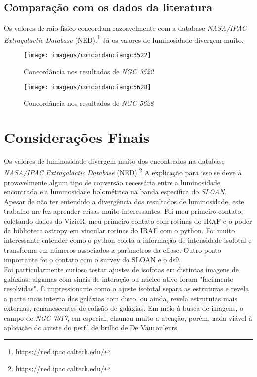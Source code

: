 \documentclass[a4paper, 11pt, fleqn, leqno]{article}
\begin{document}
\subsection{Comparação com os dados da literatura}

\noindent Os valores de raio físico concordam razoavelmente com a database \textit{NASA/IPAC Extragalactic Database} (NED).\footnote{\url{https://ned.ipac.caltech.edu/}} Já os valores de luminosidade divergem muito.\\

\begin{figure}[H]
	\centering
	\texttt{[image: imagens/concordanciangc3522]}
	\caption{Concordância nos resultados de \textit{NGC 3522}}
\end{figure}

\begin{figure}[H]
	\centering
	\texttt{[image: imagens/concordanciangc5628]}
	\caption{Concordância nos resultados de \textit{NGC 5628}}
\end{figure}

\section{Considerações Finais}

\noindent Os valores de luminosidade divergem muito dos encontrados na database \textit{NASA/IPAC Extragalactic Database} (NED).\footnote{\url{https://ned.ipac.caltech.edu/}} A explicação para isso se deve à provavelmente algum tipo de conversão necessária entre a luminosidade encontrada e a luminosidade bolométrica na banda específica do \textit{SLOAN}. \\

\noindent Apesar de não ter entendido a divergência dos resultados de luminosidade, este trabalho me fez aprender coisas muito interessantes: Foi meu primeiro contato, coletando dados do VizieR, meu primeiro contato com rotinas do IRAF e o poder da biblioteca astropy em vincular rotinas do IRAF com o python. Foi muito interessante entender como o python coleta a informação de intensidade isofotal e transforma em números associados a parâmetros da elipse. Outro ponto importante foi o contato com o survey do SLOAN e o ds9.\\

\noindent Foi particularmente curioso testar ajustes de isofotas em distintas imagens de galáxias: algumas com sinais de interação ou núcleo ativo foram "facilmente resolvidas". É impressionante como o ajuste isofotal separa as estruturas e revela a parte mais interna das galáxias com disco, ou ainda, revela estrututas mais externas, remanescentes de colisão de galáxias. Em meio à busca de imagens, o campo de \textit{NGC 7317}, em especial, chamou muito a atenção, porém, nada viável à aplicação do ajuste do perfil de brilho de De Vaucouleurs. \\
\end{document}
